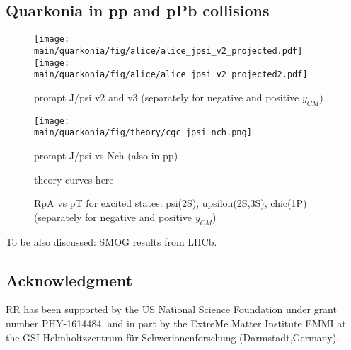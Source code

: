 \documentclass[../report.tex]{subfiles}
\providecommand{\main}{..}
\begin{document}

\clearpage

\subsection{Quarkonia in pp and pPb collisions}

\begin{figure}
 \begin{center}
  \texttt{[image: \\main/quarkonia/fig/alice/alice\_jpsi\_v2\_projected.pdf]}
  \texttt{[image: \\main/quarkonia/fig/alice/alice\_jpsi\_v2\_projected2.pdf]}
 \end{center}

 \caption{prompt J/psi v2 and v3 (separately for negative and positive $y_{CM}$)}
\end{figure}

\begin{figure}
 \begin{center}
  \texttt{[image: \\main/quarkonia/fig/theory/cgc\_jpsi\_nch.png]}
 \end{center}

 \caption{prompt J/psi vs Nch (also in pp)~\cite{Ma:2018bax}}
\end{figure}

\begin{figure}
 \begin{center}
 theory curves here
 \end{center}

 \caption{RpA vs pT for excited states: psi(2S), upsilon(2S,3S), chic(1P) (separately for negative and positive $y_{CM}$)}
\end{figure}

To be also discussed: SMOG results from LHCb.

\subsection*{Acknowledgment}
RR has been supported by the US National Science Foundation under
grant number PHY-1614484, and in part by the ExtreMe Matter Institute EMMI at 
the GSI Helmholtzzentrum f\"{u}r Schwerionenforschung (Darmstadt,Germany).
\end{document}
